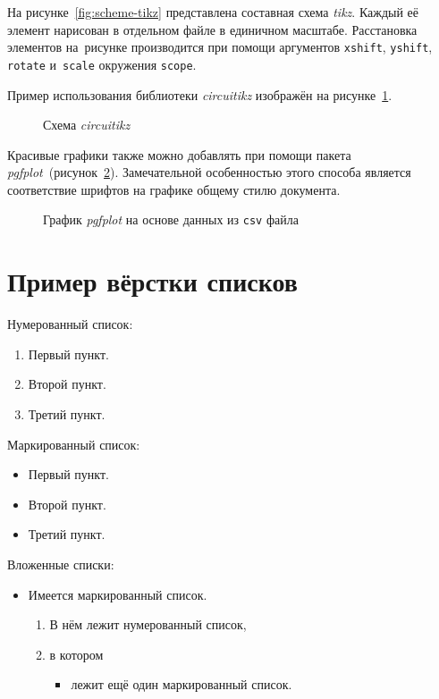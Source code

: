 На рисунке~\cref{fig:scheme-tikz} представлена составная схема \textit{tikz}.
Каждый её элемент нарисован в отдельном файле в единичном масштабе.
Расстановка элементов на~рисунке производится при помощи аргументов \texttt{xshift},
\texttt{yshift}, \texttt{rotate} и~\texttt{scale} окружения \texttt{scope}.

Пример использования библиотеки \textit{circuitikz} изображён на рисунке~\cref{fig:circuitikz}.

\begin{figure}[htbp]
    \centerfloat{
        
    }
    \caption{Схема \textit{circuitikz}}\label{fig:circuitikz}
\end{figure}

Красивые графики также можно добавлять при помощи пакета \textit{pgfplot}~(рисунок~\cref{fig:pgfplot}).
Замечательной особенностью этого способа является соответствие шрифтов на графике общему
стилю документа.

\begin{figure}[htbp]
    \centerfloat{
        
    }
    \caption{График \textit{pgfplot} на основе данных из \texttt{csv} файла}\label{fig:pgfplot}
\end{figure}


\section{Пример вёрстки списков}\label{sec:ch2/sec33}

\noindent Нумерованный список:
\begin{enumerate}
    \item Первый пункт.
    \item Второй пункт.
    \item Третий пункт.
\end{enumerate}

\noindent Маркированный список:
\begin{itemize}
    \item Первый пункт.
    \item Второй пункт.
    \item Третий пункт.
\end{itemize}

\noindent Вложенные списки:
\begin{itemize}
    \item Имеется маркированный список.
          \begin{enumerate}
              \item В нём лежит нумерованный список,
              \item в котором
                    \begin{itemize}
                        \item лежит ещё один маркированный список.
                    \end{itemize}
          \end{enumerate}
\end{itemize}

